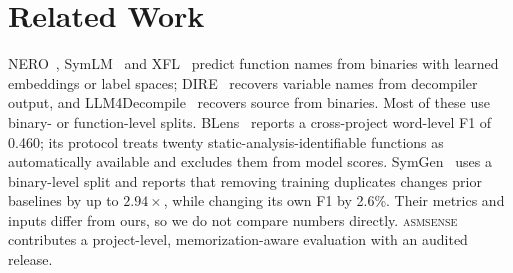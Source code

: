 \documentclass[conference]{IEEEtran}
\newcommand{\tool}{\textsc{asmsense}\xspace}
\begin{document}
\section{Related Work}
NERO~\cite{nero}, SymLM~\cite{symlm} and XFL~\cite{xfl} predict function names from binaries with learned embeddings or label spaces; DIRE~\cite{dire} recovers variable names from decompiler output, and LLM4Decompile~\cite{llm4decompile} recovers source from binaries. Most of these use binary- or function-level splits. BLens~\cite{blens} reports a cross-project word-level F1 of 0.460; its protocol treats twenty static-analysis-identifiable functions as automatically available and excludes them from model scores. SymGen~\cite{symgen} uses a binary-level split and reports that removing training duplicates changes prior baselines by up to $2.94\times$, while changing its own F1 by 2.6\%. Their metrics and inputs differ from ours, so we do not compare numbers directly. \tool contributes a project-level, memorization-aware evaluation with an audited release.



\end{document}
